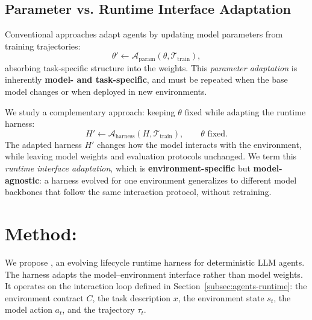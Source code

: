 \subsection{Parameter vs. Runtime Interface Adaptation}

Conventional approaches adapt agents by updating model parameters from training trajectories:
\[
    \theta' \leftarrow \mathcal{A}_{\mathrm{param}}(\theta,\mathcal{T}_{\mathrm{train}}),
\]
absorbing task-specific structure into the weights. This \emph{parameter adaptation} is inherently \textbf{model- and task-specific}, and must be repeated when the base model changes or when deployed in new environments. 

We study a complementary approach: keeping \(\theta\) fixed while adapting the runtime harness:
\[
    H' \leftarrow \mathcal{A}_{\mathrm{harness}}(H,\mathcal{T}_{\mathrm{train}}),
    \qquad
    \theta \text{ fixed}.
\]
The adapted harness \(H'\) changes how the model interacts with the environment, while leaving model weights and evaluation protocols unchanged. We term this \emph{runtime interface adaptation}, which is \textbf{environment-specific} but \textbf{model-agnostic}: a harness evolved for one environment generalizes to different model backbones that follow the same interaction protocol, without retraining.
\section{Method: \method{} }
\label{sec:method}

We propose \method{}, an evolving lifecycle runtime harness for
deterministic LLM agents. The harness adapts the model--environment interface
rather than model weights. It operates on the interaction loop defined in
Section~\ref{subsec:agents-runtime}: the environment contract \(C\), the task
description \(x\), the environment state \(s_t\), the model action \(a_t\), and
the trajectory \(\tau_t\).
